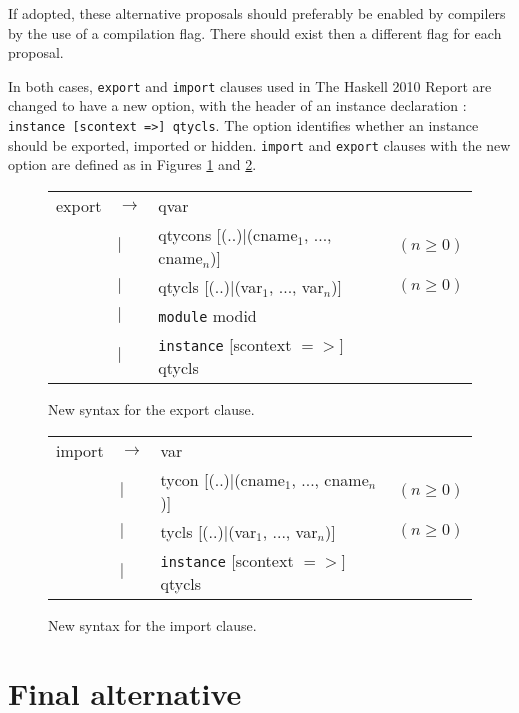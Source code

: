 \documentclass[msc]{ppgccufmg}
\begin{document}
If adopted, these alternative proposals should
preferably be enabled by compilers by the use of a compilation flag.  There
should exist then a different flag for each proposal.

In both cases, \texttt{export} and \texttt{import} clauses used in
The Haskell 2010 Report \citep[sections 5.2 and 5.3]{report} are
changed to have a new option, with the header of
an instance declaration \citep[section~4.3.2]{report}: \texttt{instance
  [scontext =>] qtycls}.  The option identifies whether an instance should be
exported, imported or hidden.  \texttt{import} and \texttt{export} clauses with the new option are defined as in
Figures \ref{export} and \ref{import}.

\begin{figure}
\caption{New syntax for the export clause.\label{export}}
\begin{tabular}{|l l l l|}
\hline
export & $\to$ & qvar &\\
& $|$ & qtycons [(..)$|$(cname$_1$, ..., cname$_n$)] & $(n \geq 0)$\\
& $|$ & qtycls [(..)$|$(var$_1$, ..., var$_n$)] & $(n \geq 0)$\\
& $|$ & \texttt{module} modid &\\
& $|$ & \texttt{instance} [scontext $=>$] qtycls &\\
\hline
\end{tabular}
\end{figure}

\begin{figure}
\caption{New syntax for the import clause.\label{import}}
\begin{tabular}{|l l l l|}
\hline
import & $\to$ & var &\\
& $|$ & tycon [(..)$|$(cname$_1$, ..., cname$_n$)] & $(n \geq 0)$\\
& $|$ & tycls [(..)$|$(var$_1$, ..., var$_n$)] & $(n \geq 0)$\\
& $|$ & \texttt{instance} [scontext $=>$] qtycls &\\
\hline
\end{tabular}
\end{figure}

\section{Final alternative}
\end{document}
